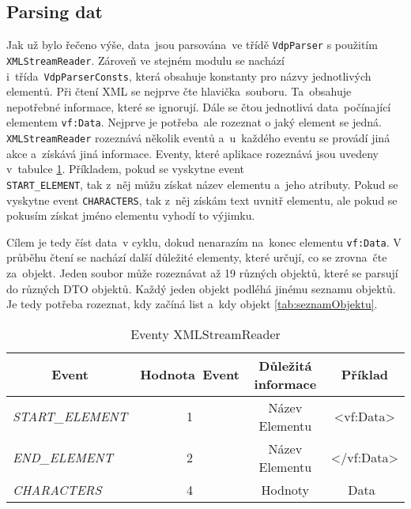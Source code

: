 \subsection{Parsing dat}
Jak už bylo řečeno výše, data~jsou parsována~ve třídě \texttt{VdpParser} s použitím \\ \texttt{XMLStreamReader}.
Zároveň ve stejném modulu se nachází i~třída~\texttt{VdpParserConsts}, která obsahuje konstanty pro názvy jednotlivých elementů.
Při čtení XML se nejprve čte hlavička~souboru. Ta~obsahuje nepotřebné informace, které se ignorují.
Dále se čtou jednotlivá data~počínající elementem \texttt{vf:Data}.
Nejprve je potřeba~ale rozeznat o jaký element se jedná.
\texttt{XMLStreamReader} rozeznává několik eventů a~u~každého eventu se provádí jiná akce a~získává jiná informace.
Eventy, které aplikace rozeznává jsou uvedeny v~tabulce \ref{tab:xmlStreamReader}.
Příkladem, pokud se vyskytne event \\ \texttt{START\_ELEMENT}, tak z~něj můžu získat název elementu a~jeho atributy.
Pokud se vyskytne event \texttt{CHARACTERS}, tak z~něj získám text uvnitř elementu, ale pokud se pokusím získat jméno elementu vyhodí to výjimku.

Cílem je tedy číst data~v cyklu, dokud nenarazím na~konec elementu \texttt{vf:Data}.
V průběhu čtení se nachází další důležité elementy, které určují, co se zrovna~čte za~objekt.
Jeden soubor může rozeznávat až 19 různých objektů, které se parsují do různých DTO objektů.
Každý jeden objekt podléhá jinému seznamu objektů.
Je tedy potřeba rozeznat, kdy začíná list a~kdy objekt \ref{tab:seznamObjektu}.

\begin{table}[!h]
    \centering
    \caption{Eventy XMLStreamReader}
    \label{tab:xmlStreamReader}
    \begin{tabular}{|l|c|c|c|}
    \hline
    \multicolumn{1}{|c|}{\textbf{Event}} & \textbf{Hodnota~Event} & \textbf{Důležitá informace} & \textbf{Příklad}                                 \\ \hline
    \textit{START\_ELEMENT}              & 1                      & Název Elementu              & \textless{}vf:Data\textgreater{}                 \\ \hline
    \textit{END\_ELEMENT}                & 2                      & Název Elementu              & \textless{}/vf:Data\textgreater{}                \\ \hline
    \textit{CHARACTERS}                  & 4                      & Hodnoty                     & Data~                                            \\ \hline
    \end{tabular}
\end{table}

